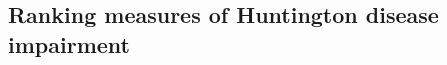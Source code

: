 \documentclass[12pt]{article}
\def\bV{{\boldsymbol V}}
\begin{document}


\subsection{Ranking measures of Huntington disease impairment}
\label{sec:ranking_outcomes}
\end{document}
